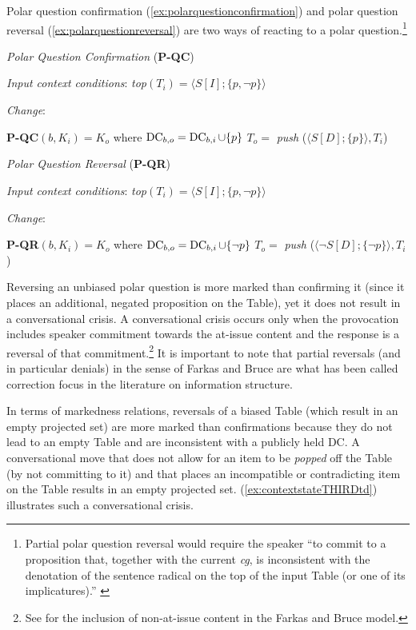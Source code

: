Polar question confirmation (\ref{ex:polarquestionconfirmation}) and polar question reversal (\ref{ex:polarquestionreversal}) are two ways of reacting to a polar question.\footnote{Partial polar question reversal would require the speaker ``to commit to a proposition that, together with the current \textit{cg}, is inconsistent with the denotation of the sentence radical on the top of the input Table (or one of its implicatures).'' \citep[105]{FarkasBruce.2010}} 

\begin{exe}
\ex\label{ex:polarquestionconfirmation} \textit{Polar Question Confirmation} (\textbf{P-QC}) 
	\begin{xlist}
		\ex \textit{Input context conditions}:
		\textit{top}$(T_i)=\langle S [I];\{ p,\neg p \}\rangle$
		
		\ex \textit{Change}: 
		\begin{xlist}
			\ex \textbf{P-QC}$(b,K_i)=K_o$ where $\operatorname{DC}_{b,o}=\operatorname{DC}_{b,i}\cup \{ p \}$ 
			\ex $T_o=$ \textit{push} ($\langle S [D];\{ p \}\rangle, T_i$) 
		\end{xlist}
	\end{xlist}
\ex\label{ex:polarquestionreversal} \textit{Polar Question Reversal} (\textbf{P-QR}) 
	\begin{xlist}
		\ex \textit{Input context conditions}:
		\textit{top}$(T_i)=\langle S [I];\{ p,\neg p \}\rangle$
		
		\ex \textit{Change}: 
		\begin{xlist}
			\ex \textbf{P-QR}$(b,K_i)=K_o$ where $\operatorname{DC}_{b,o}=\operatorname{DC}_{b,i}\cup \{\neg p \}$ 
			\ex $T_o=$ \textit{push} ($\langle \neg S [D];\{\neg p \}\rangle, T_i$) 
		\end{xlist}
	\end{xlist}
\end{exe}

Reversing an unbiased polar question is more marked than confirming it (since it places an additional, negated proposition on the Table), yet it does not result in a conversational crisis. A conversational crisis occurs only when the provocation includes speaker commitment towards the at-issue content and the response is a reversal of that commitment.\footnote{See  for the inclusion of non-at-issue content in the Farkas and Bruce model.} It is important to note that partial reversals (and in particular denials) in the sense of Farkas and Bruce are what has been called correction focus in the literature on information structure.

In terms of markedness relations, reversals of a biased Table (which result in an empty projected set) are more marked than confirmations because they do not lead to an empty Table and are inconsistent with a publicly held DC. A conversational move that does not allow for an item to be \textit{popped} off the Table (by not committing to it) and that places an incompatible or contradicting item on the Table results in an empty projected set. (\ref{ex:contextstateTHIRDtd}) illustrates such a conversational crisis.

